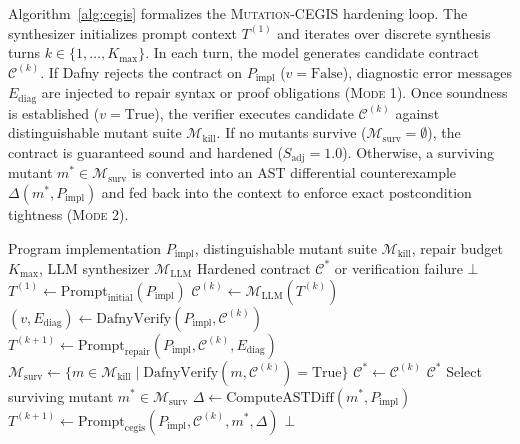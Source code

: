 \documentclass{article}
\begin{document}
Algorithm~\ref{alg:cegis} formalizes the \textsc{Mutation-CEGIS} hardening loop. The synthesizer initializes prompt context $T^{(1)}$ and iterates over discrete synthesis turns $k \in \{1, \dots, K_{\max}\}$. In each turn, the model generates candidate contract $\mathcal{C}^{(k)}$. If Dafny rejects the contract on $P_{\text{impl}}$ ($v = \text{False}$), diagnostic error messages $E_{\text{diag}}$ are injected to repair syntax or proof obligations (\textsc{Mode 1}). Once soundness is established ($v = \text{True}$), the verifier executes candidate $\mathcal{C}^{(k)}$ against distinguishable mutant suite $\mathcal{M}_{\text{kill}}$. If no mutants survive ($\mathcal{M}_{\text{surv}} = \emptyset$), the contract is guaranteed sound and hardened ($S_{\text{adj}} = 1.0$). Otherwise, a surviving mutant $m^* \in \mathcal{M}_{\text{surv}}$ is converted into an AST differential counterexample $\Delta(m^*, P_{\text{impl}})$ and fed back into the context to enforce exact postcondition tightness (\textsc{Mode 2}).

\begin{algorithm}[H]
\caption{\textsc{Mutation-CEGIS} Contract Hardening}
\label{alg:cegis}
\begin{algorithmic}[1]
\REQUIRE Program implementation $P_{\text{impl}}$, distinguishable mutant suite $\mathcal{M}_{\text{kill}}$, repair budget $K_{\max}$, LLM synthesizer $\mathcal{M}_{\text{LLM}}$
\ENSURE Hardened contract $\mathcal{C}^*$ or verification failure $\bot$
\STATE $T^{(1)} \leftarrow \text{Prompt}_{\text{initial}}(P_{\text{impl}})$
    \STATE $\mathcal{C}^{(k)} \leftarrow \mathcal{M}_{\text{LLM}}(T^{(k)})$ 
    \STATE $(v, E_{\text{diag}}) \leftarrow \text{DafnyVerify}(P_{\text{impl}}, \mathcal{C}^{(k)})$ 
        \STATE $T^{(k+1)} \leftarrow \text{Prompt}_{\text{repair}}(P_{\text{impl}}, \mathcal{C}^{(k)}, E_{\text{diag}})$ 
    \ELSE
        \STATE $\mathcal{M}_{\text{surv}} \leftarrow \{m \in \mathcal{M}_{\text{kill}} \mid \text{DafnyVerify}(m, \mathcal{C}^{(k)}) = \text{True}\}$ 
            \STATE $\mathcal{C}^* \leftarrow \mathcal{C}^{(k)}$
            \RETURN $\mathcal{C}^*$ 
        \ELSE
            \STATE Select surviving mutant $m^* \in \mathcal{M}_{\text{surv}}$
            \STATE $\Delta \leftarrow \text{ComputeASTDiff}(m^*, P_{\text{impl}})$ 
            \STATE $T^{(k+1)} \leftarrow \text{Prompt}_{\text{cegis}}(P_{\text{impl}}, \mathcal{C}^{(k)}, m^*, \Delta)$ 
        \ENDIF
    \ENDIF
\ENDFOR
\RETURN $\bot$ 
\end{algorithmic}
\end{algorithm}
\end{document}
